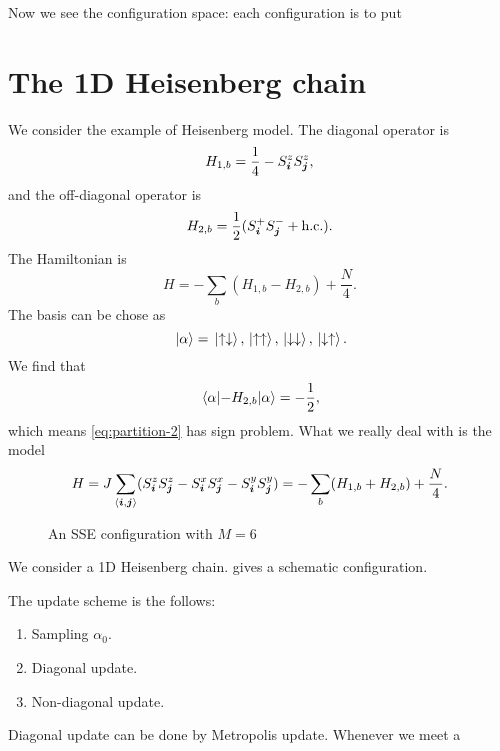 \documentclass[hyperref, a4paper]{article}
\newcommand*{\pair}[1]{\langle #1 \rangle}
\begin{document}
Now we see the configuration space: each configuration is to put 

\section{The 1D Heisenberg chain}

We consider the example of Heisenberg model. The diagonal operator is 
\begin{equation}
    H_{1, b} = \frac{1}{4} - S^z_{\vb*{i}} S^z_{\vb*{j}},
\end{equation}
and the off-diagonal operator is 
\begin{equation}
    H_{2, b} = \frac{1}{2} (S_{\vb*{i}}^+ S_{\vb*{j}}^- + \text{h.c.}).
\end{equation}
The Hamiltonian is 
\begin{equation}
    H = - \sum_b (H_{1, b} - H_{2, b}) + \frac{N}{4}.
\end{equation}
The basis can be chose as 
\begin{equation}
    \ket*{\alpha} = \ket*{\uparrow \downarrow}, \ket*{\uparrow \uparrow}, \ket*{\downarrow \downarrow}, \ket*{\downarrow \uparrow}.
\end{equation}
We find that 
\[
    \mel{\alpha}{-H_{2, b}}{\alpha} = - \frac{1}{2},
\]
which means \eqref{eq:partition-2} has sign problem. What we really deal with is the model 
\begin{equation}
    H = J \sum_{\pair{\vb*{i}, \vb*{j}}} (S^z_{\vb*{i}} S^z_{\vb*{j}} - S^x_{\vb*{i}} S^x_{\vb*{j}} - S^y_{\vb*{i}} S^y_{\vb*{j}}) = - \sum_b (H_{1, b} + H_{2, b}) + \frac{N}{4}.
\end{equation}

\begin{figure}
    \centering
    
    \caption{An SSE configuration with $M=6$}
    \label{fig:chain-config}
\end{figure}

We consider a 1D Heisenberg chain.  gives a schematic configuration.

The update scheme is the follows:
\begin{enumerate}
    \item Sampling $\alpha_0$.
    \item Diagonal update. 
    \item Non-diagonal update.
\end{enumerate} 

Diagonal update can be done by Metropolis update. Whenever we meet a 
\end{document}
